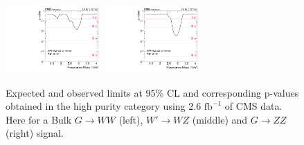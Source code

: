 \begin{figure}[h!]
\includegraphics[width=0.327\textwidth]{figures/analysis/search1/AN-15-211/pvalues/pvalue_WZinVVnew_high_purity.pdf}
\includegraphics[width=0.327\textwidth]{figures/analysis/search1/AN-15-211/pvalues/pvalue_BulkZZinVVnew_high_purity.pdf}
\caption{Expected and observed limits at 95\% CL and corresponding p-values obtained in the high purity category using 2.6 $\textrm{fb}^{-1}$ of CMS data. Here for a Bulk $G\rightarrow WW$ (left), $W'\rightarrow WZ$ (middle) and $G\rightarrow ZZ$ (right) signal.}
\label{fig:app:Limits_HP}
\end{figure}
